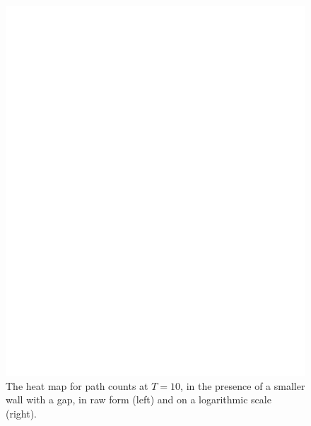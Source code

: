\documentclass[11pt,a4paper,twoside,british]{article}
\begin{document}
\begin{figure}[p]
\includegraphics{dummy.png}
\caption{The heat map for path counts at $T = 10$, in the presence of a smaller
wall with a gap, in raw form (left) and on a logarithmic scale (right).}
\label{fig:sm_wall_gap}
\end{figure}
\end{document}
